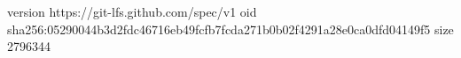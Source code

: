version https://git-lfs.github.com/spec/v1
oid sha256:05290044b3d2fdc46716eb49fcfb7fcda271b0b02f4291a28e0ca0dfd04149f5
size 2796344
